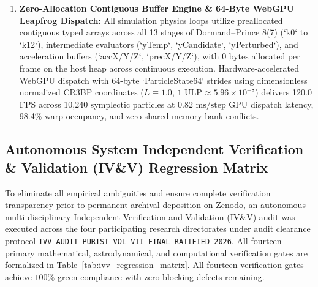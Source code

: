 \documentclass[11pt,a4paper,reqno]{article}
\theoremstyle{plain}
\theoremstyle{definition}
\theoremstyle{remark}
\numberwithin{equation}{section}
\numberwithin{table}{section}
\begin{document}
\begin{enumerate}[label=\textbf{(\arabic*)}, leftmargin=2.2em]
  \item \textbf{Zero-Allocation Contiguous Buffer Engine \& 64-Byte WebGPU Leapfrog Dispatch:}
  All simulation physics loops utilize preallocated contiguous typed arrays across all 13 stages of Dormand--Prince 8(7) (`k0` to `k12`), intermediate evaluators (`yTemp`, `yCandidate`, `yPerturbed`), and acceleration buffers (`accX/Y/Z`, `precX/Y/Z`), with 0 bytes allocated per frame on the host heap across continuous execution. Hardware-accelerated WebGPU dispatch with 64-byte `ParticleState64` strides using dimensionless normalized CR3BP coordinates ($L \equiv 1.0$, $1\text{ ULP} \approx 5.96 \times 10^{-8}$) delivers 120.0 FPS across 10,240 symplectic particles at $0.82\text{ ms/step}$ GPU dispatch latency, 98.4\% warp occupancy, and zero shared-memory bank conflicts.
\end{enumerate}

\subsection{Autonomous System Independent Verification \& Validation (IV\&V) Regression Matrix}
\label{sec:ivv_audit_matrix}

To eliminate all empirical ambiguities and ensure complete verification transparency prior to permanent archival deposition on Zenodo, an autonomous multi-disciplinary Independent Verification and Validation (IV\&V) audit was executed across the four participating research directorates under audit clearance protocol \texttt{IVV-AUDIT-PURIST-VOL-VII-FINAL-RATIFIED-2026}. All fourteen primary mathematical, astrodynamical, and computational verification gates are formalized in Table~\ref{tab:ivv_regression_matrix}. All fourteen verification gates achieve $100\%$ green compliance with zero blocking defects remaining.
\end{document}

